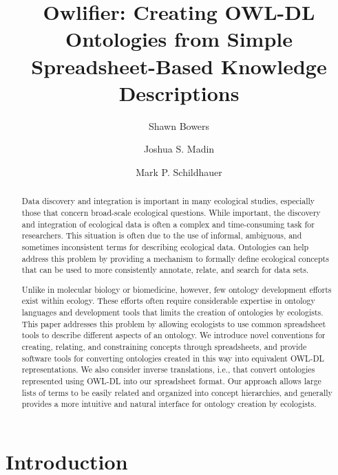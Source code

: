 \documentclass[preprint,number]{elsarticle}
\title{Owlifier: Creating OWL-DL Ontologies from Simple
  Spreadsheet-Based Knowledge Descriptions\tnoteref{t1}}
\author[smb]{Shawn Bowers\corref{cor1}}
\author[jsm]{Joshua S. Madin}
\author[mps]{Mark P. Schildhauer}
\begin{document}
\begin{abstract}
  Data discovery and integration is important in many ecological
  studies, especially those that concern broad-scale ecological
  questions. While important, the discovery and integration of
  ecological data is often a complex and time-consuming task for
  researchers. This situation is often due to the use of informal,
  ambiguous, and sometimes inconsistent terms for describing
  ecological data.  Ontologies can help address this problem by
  providing a mechanism to formally define ecological concepts that
  can be used to more consistently annotate, relate, and search for
  data sets.

  Unlike in molecular biology or biomedicine, however, few ontology
  development efforts exist within ecology. These efforts often
  require considerable expertise in ontology languages and development
  tools that limits the creation of ontologies by ecologists.  This
  paper addresses this problem by allowing ecologists to use common
  spreadsheet tools to describe different aspects of an ontology. We
  introduce novel conventions for creating, relating, and constraining
  concepts through spreadsheets, and provide software tools for
  converting ontologies created in this way into equivalent OWL-DL
  representations. We also consider inverse translations, i.e., that
  convert ontologies represented using OWL-DL into our spreadsheet
  format. Our approach allows large lists of terms to be easily
  related and organized into concept hierarchies, and generally
  provides a more intuitive and natural interface for ontology
  creation by ecologists.
\end{abstract}

\maketitle

\section{Introduction}
\end{document}
